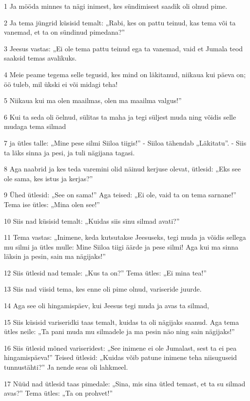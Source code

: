 \par 1 Ja mööda minnes ta nägi inimest, kes sündimisest saadik oli olnud pime.
\par 2 Ja tema jüngrid küsisid temalt: „Rabi, kes on pattu teinud, kas tema või ta vanemad, et ta on sündinud pimedana?”
\par 3 Jeesus vastas: „Ei ole tema pattu teinud ega ta vanemad, vaid et Jumala teod saaksid temas avalikuks.
\par 4 Meie peame tegema selle tegusid, kes mind on läkitanud, niikaua kui päeva on; öö tuleb, mil ükski ei või midagi teha!
\par 5 Niikaua kui ma olen maailmas, olen ma maailma valgus!”
\par 6 Kui ta seda oli öelnud, sülitas ta maha ja tegi süljest muda ning võidis selle mudaga tema silmad
\par 7 ja ütles talle: „Mine pese silmi Siiloa tiigis!” - Siiloa tähendab „Läkitatu”. - Siis ta läks sinna ja pesi, ja tuli nägijana tagasi.
\par 8 Aga naabrid ja kes teda varemini olid näinud kerjuse olevat, ütlesid: „Eks see ole sama, kes istus ja kerjas?”
\par 9 Ühed ütlesid: „See on sama!” Aga teised: „Ei ole, vaid ta on tema sarnane!” Tema ise ütles: „Mina olen see!”
\par 10 Siis nad küsisid temalt: „Kuidas siis sinu silmad avati?”
\par 11 Tema vastas: „Inimene, keda kutsutakse Jeesuseks, tegi muda ja võidis sellega mu silmi ja ütles mulle: Mine Siiloa tiigi äärde ja pese silmi! Aga kui ma sinna läksin ja pesin, sain ma nägijaks!”
\par 12 Siis ütlesid nad temale: „Kus ta on?” Tema ütles: „Ei mina tea!”
\par 13 Siis nad viisid tema, kes enne oli pime olnud, variseride juurde.
\par 14 Aga see oli hingamispäev, kui Jeesus tegi muda ja avas ta silmad,
\par 15 Siis küsisid variseridki taas temalt, kuidas ta oli nägijaks saanud. Aga tema ütles neile: „Ta pani muda mu silmadele ja ma pesin näo ning sain nägijaks!”
\par 16 Siis ütlesid mõned variseridest: „See inimene ei ole Jumalast, sest ta ei pea hingamispäeva!” Teised ütlesid: „Kuidas võib patune inimene teha niisuguseid tunnustähti?” Ja nende seas oli lahkmeel.
\par 17 Nüüd nad ütlesid taas pimedale: „Sina, mis sina ütled temast, et ta su silmad avas?” Tema ütles: „Ta on prohvet!”
